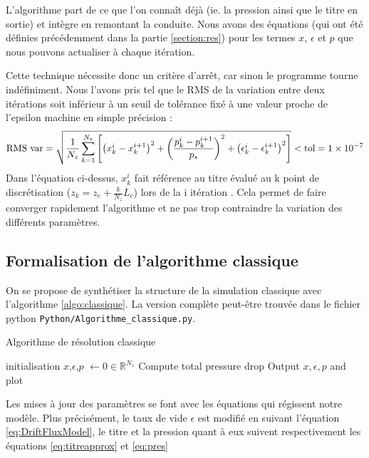 L'algorithme part de ce que l'on connaît déjà (ie. la pression ainsi que le titre en sortie) et intègre en \og remontant \fg{} la conduite. Nous avons des équations (qui ont été définies précédemment dans la partie \ref{section:res}) pour les termes $x$, $\epsilon$ et $p$ que nous pouvons actualiser à chaque itération.\\ \par
Cette technique nécessite donc un critère d'arrêt, car sinon le programme tourne indéfiniment. Nous l'avons pris tel que le RMS de la variation entre deux itérations soit inférieur à un seuil de tolérance fixé à une valeur proche de l'epsilon machine en simple précision :
\begin{equation}
    \textnormal{RMS var} = \sqrt{\frac{1}{N_z}\sum_{k=1}^{N_z}\left[\left(x^{i}_k-x^{i+1}_k\right)^2 + \left(\frac{p^i_k- p^{i+1}_k}{p_s} \right)^2 + \left(\epsilon^i_k - \epsilon^{i+1}_k \right)^2\right]} <  \textnormal{tol} =\num{1e-7}
\end{equation}
Dans l'équation ci-dessus, $x^i_k$ fait référence au titre évalué au k point de discrétisation ($z_k = z_e + \frac{k}{N_z}L_c$) lors de la i itération . Cela permet de faire converger rapidement l'algorithme et ne pas trop contraindre la variation des différents paramètres.


\subsection{Formalisation de l'algorithme classique}

On se propose de synthétiser la structure de la simulation classique avec l'algorithme \ref{algo:classique}. La version complète peut-être trouvée dans le fichier python \verb|Python/Algorithme_classique.py|.

\begin{algorithm}
\label{algo:classique}
\caption{Algorithme de résolution classique}
\SetAlgoLined
{}
initialisation\;
$x$,$\epsilon$,$p$ $\leftarrow 0 \in \mathbb{R}^{N_z}$ \;
Compute total pressure drop\;
Output $x,\epsilon,p$ and plot\;
\end{algorithm}
Les mises à jour des paramètres se font avec les équations qui régissent notre modèle. Plus précisément, le taux de vide $\epsilon$ est modifié en suivant l'équation \ref{eq:DriftFluxModel}, le titre et la pression quant à eux suivent respectivement les équations \ref{eq:titreapprox} et \ref{eq:pres}

